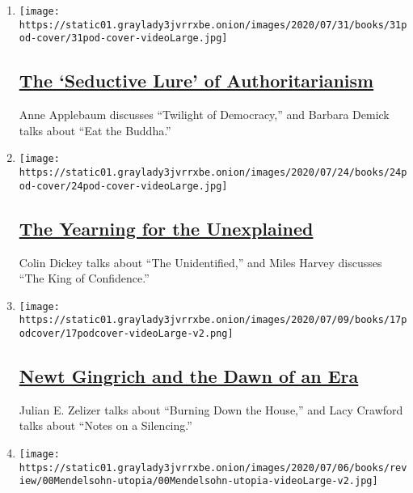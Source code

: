 \begin{enumerate}
\def\labelenumi{\arabic{enumi}.}
\item
  \texttt{[image: https://static01.graylady3jvrrxbe.onion/images/2020/07/31/books/31pod-cover/31pod-cover-videoLarge.jpg]}

  \hypertarget{the-seductive-lure-of-authoritarianism}{%
  \subsection{\texorpdfstring{\href{/2020/07/31/books/review/podcast-twilight-democracy-anne-applebaum-eat-buddha-barbara-demick.html}{The
  `Seductive Lure' of
  Authoritarianism}}{The `Seductive Lure' of Authoritarianism}}\label{the-seductive-lure-of-authoritarianism}}

  Anne Applebaum discusses ``Twilight of Democracy,'' and Barbara Demick
  talks about ``Eat the Buddha.''
\item
  \texttt{[image: https://static01.graylady3jvrrxbe.onion/images/2020/07/24/books/24pod-cover/24pod-cover-videoLarge.jpg]}

  \hypertarget{the-yearning-for-the-unexplained}{%
  \subsection{\texorpdfstring{\href{/2020/07/24/books/review/podcast-colin-dickey-unexplained-miles-harvey-king-of-confidence.html}{The
  Yearning for the
  Unexplained}}{The Yearning for the Unexplained}}\label{the-yearning-for-the-unexplained}}

  Colin Dickey talks about ``The Unidentified,'' and Miles Harvey
  discusses ``The King of Confidence.''
\item
  \texttt{[image: https://static01.graylady3jvrrxbe.onion/images/2020/07/09/books/17podcover/17podcover-videoLarge-v2.png]}

  \hypertarget{newt-gingrich-and-the-dawn-of-an-era}{%
  \subsection{\texorpdfstring{\href{/2020/07/17/books/review/podcast-julian-zelizer-burning-down-house-newt-gingrich-notes-silencing-lacy-crawford.html}{Newt
  Gingrich and the Dawn of an
  Era}}{Newt Gingrich and the Dawn of an Era}}\label{newt-gingrich-and-the-dawn-of-an-era}}

  Julian E. Zelizer talks about ``Burning Down the House,'' and Lacy
  Crawford talks about ``Notes on a Silencing.''
\item
  \texttt{[image: https://static01.graylady3jvrrxbe.onion/images/2020/07/06/books/review/00Mendelsohn-utopia/00Mendelsohn-utopia-videoLarge-v2.jpg]}


\end{enumerate}
